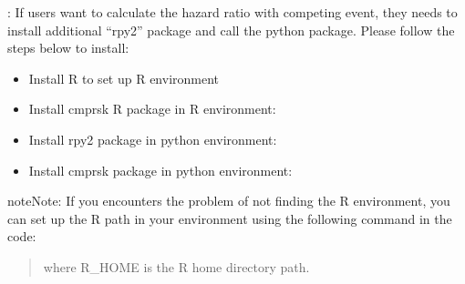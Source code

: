 \documentclass[letterpaper,10pt,english]{sphinxmanual}
\begin{document}
\sphinxAtStartPar
{}: If users want to calculate the hazard ratio with competing event, they needs to install additional “rpy2” package
and call the python  package. Please follow the steps below to install:
\begin{itemize}
\item {} 
\sphinxAtStartPar
Install R to set up R environment

\item {} 
\sphinxAtStartPar
Install cmprsk R package in R environment:

\begin{sphinxVerbatim}[commandchars=\\\{\}]
\end{sphinxVerbatim}

\item {} 
\sphinxAtStartPar
Install rpy2 package in python environment:

\begin{sphinxVerbatim}[commandchars=\\\{\}]
  
\end{sphinxVerbatim}

\item {} 
\sphinxAtStartPar
Install cmprsk package in python environment:

\begin{sphinxVerbatim}[commandchars=\\\{\}]
  
\end{sphinxVerbatim}

\end{itemize}

\begin{sphinxadmonition}{note}{Note:}
\sphinxAtStartPar
If you encounters the problem of not finding the R environment, you can set up the R path
in your environment using the following command in the code:
\begin{quote}

\begin{sphinxVerbatim}[commandchars=\\\{\}]
 
\PYG{p}{[}\PYG{p}{]}  
\end{sphinxVerbatim}

\sphinxAtStartPar
where R\_HOME is the R home directory path.
\end{quote}
\end{sphinxadmonition}
\end{document}

